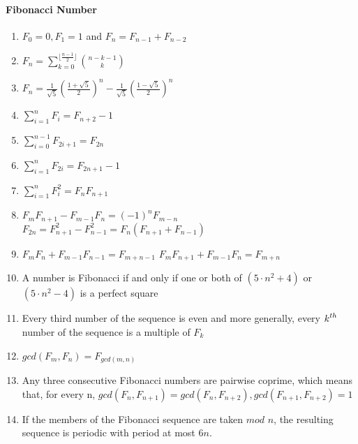 \paragraph{Fibonacci Number}\begin{enumerate}

            
            \item $\displaystyle F_0=0, F_1=1$ and $\displaystyle F_n=F_{n-1}+F_{n-2}$
            \item $\displaystyle F_n=\sum\limits_{k=0}^{\lfloor\frac{n-1}{2}\rfloor}\binom{n-k-1}{k}$
            \item $\displaystyle
                F_n=\frac{1}{\sqrt{5}}(\frac{1+\sqrt{5}}{2})^n-\frac{1}{\sqrt{5}}(\frac{1-\sqrt{5}}{2})^n$
            
            \item $\displaystyle \sum\limits_{i=1}^{n}F_i=F_{n+2}-1$
            \item $\displaystyle \sum\limits_{i=0}^{n-1}F_{2i+1}=F_{2n}$
            \item $\displaystyle \sum\limits_{i=1}^{n}F_{2i}=F_{2n+1}-1$
            \item $\displaystyle \sum\limits_{i=1}^{n}F_{i}^{2}=F_nF_{n+1}$
            \item $\displaystyle F_mF_{n+1}-F_{m-1}F_{n}=(-1)^nF_{m-n}$
                $\displaystyle F_{2n}=F_{n+1}^2-F_{n-1}^2=F_n(F_{n+1}+F_{n-1})$
            \item $\displaystyle F_mF_n+F_{m-1}F_{n-1}=F_{m+n-1}$
                $\displaystyle F_mF_{n+1}+F_{m-1}F_{n}=F_{m+n}$
            \item A number is Fibonacci if and only if one or both of $\displaystyle (5 \cdot n^2 + 4)$ or $\displaystyle
                (5
                \cdot
                n^2 - 4)$ is a perfect square
            \item Every third number of the sequence is even and more generally, every $\displaystyle \displaystyle
                k^{th}$
                number
                of the sequence is a multiple of $\displaystyle F_k$
            \item $gcd(F_m, F_n)=F_{gcd(m, n)}$
            \item Any three consecutive Fibonacci numbers are pairwise coprime, which means that, for every n, $gcd(F_n,
                F_{n+1})=gcd(F_n, F_{n+2}), gcd(F_{n+1}, F_{n+2})=1$
            \item 
                If the members of the Fibonacci sequence are taken $mod$ $n$, the resulting sequence is periodic with
                    period
                    at most $6n$.

                \end{enumerate}
